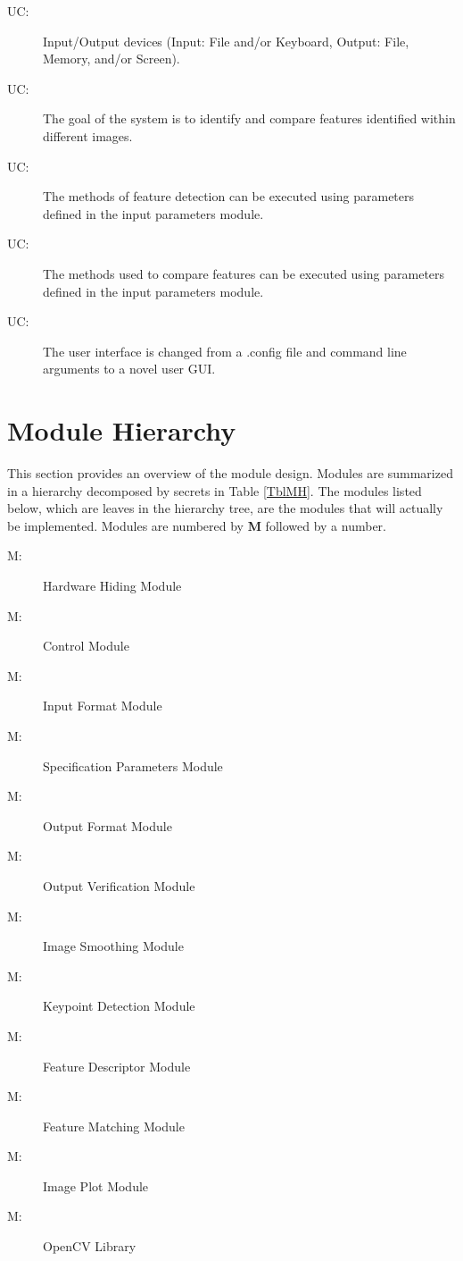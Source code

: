 \documentclass[12pt, titlepage]{article}
\newcounter{ucnum}
\newcommand{\uctheucnum}{UC\theucnum}
\newcounter{mnum}
\newcommand{\mthemnum}{M\themnum}
\begin{document}
\begin{description}
\item[ \uctheucnum \label{ucIO}:] Input/Output devices
  (Input: File and/or Keyboard, Output: File, Memory, and/or Screen).
\item[ \uctheucnum \label{ucGoal}:]  The goal of the system 
is to identify and compare features identified within different images.
\item[ \uctheucnum \label{ucDetectMethod}:]  The methods of 
feature detection can be executed using parameters defined in the input parameters 
module.
\item[ \uctheucnum \label{ucMatchMethod}:]  The methods used 
to compare features can be executed using parameters defined in the input parameters 
module.
\item[ \uctheucnum \label{ucConfig}:]  The user interface is 
changed from a .config file and command line arguments to a novel user GUI.
  
\end{description}

\section{Module Hierarchy} \label{SecMH}

This section provides an overview of the module design. Modules are summarized
in a hierarchy decomposed by secrets in Table \ref{TblMH}. The modules listed
below, which are leaves in the hierarchy tree, are the modules that will
actually be implemented. Modules are numbered by \textbf{M} followed by a number.
\begin{description}
\item [ \mthemnum \label{mHH}:] Hardware Hiding Module
\item [ \mthemnum \label{mC}:] Control Module
\item [ \mthemnum \label{mIF}:] Input Format Module
\item [ \mthemnum \label{mSP}:] Specification Parameters Module
\item [ \mthemnum \label{mOF}:] Output Format Module
\item [ \mthemnum \label{mOV}:] Output Verification Module
\item [ \mthemnum \label{mIS}:] Image Smoothing Module
\item [ \mthemnum \label{mKD}:] Keypoint Detection Module
\item [ \mthemnum \label{mFD}:] Feature Descriptor Module
\item [ \mthemnum \label{mFM}:] Feature Matching Module
\item [ \mthemnum \label{mIP}:] Image Plot Module
\item [ \mthemnum \label{mOpenCV}:] OpenCV Library
\end{description}
\end{document}
